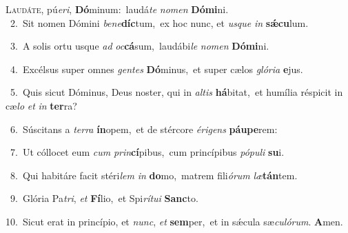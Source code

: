 \lettrine{\initial\textcolor{\initialcolor}{L}}{audáte,} pú\-\textit{e}\-\textit{ri}, \textbf{Dó}\-minum:~\star laudá\textit{te} \textit{no}\-\textit{men} \textbf{Dó}\-\textbf{mi}ni.\\
{\numbfont\textcolor{\numbcolor}{~2.}}~Sit nomen Dómini \textit{be}\-\textit{ne}\textbf{díc}tum,~\star ex hoc nunc, et \textit{us}\-\textit{que} \textit{in} \textbf{sǽ}\-\textbf{cu}lum.\par
{\numbfont\textcolor{\numbcolor}{~3.}}~A solis ortu usque \textit{ad} \textit{oc}\-\textbf{cá}sum,~\star laudábi\textit{le} \textit{no}\-\textit{men} \textbf{Dó}\-\textbf{mi}ni.\par
{\numbfont\textcolor{\numbcolor}{~4.}}~Excélsus super omnes \textit{gen}\-\textit{tes} \textbf{Dó}\-minus,~\star et super cælos \textit{gló}\-\textit{ri}\textit{a} \textbf{e}\-jus.\par
{\numbfont\textcolor{\numbcolor}{~5.}}~Quis sicut Dóminus, Deus noster, qui in \textit{al}\-\textit{tis} \textbf{há}\-bitat,~\star et humília réspicit in cæ\textit{lo} \textit{et} \textit{in} \textbf{ter}\-ra?\par
{\numbfont\textcolor{\numbcolor}{~6.}}~Súscitans a \textit{ter}\-\textit{ra} \textbf{ín}\-opem,~\star et de stércore \textit{é}\-\textit{ri}\textit{gens} \textbf{páu}\-\textbf{pe}rem:\par
{\numbfont\textcolor{\numbcolor}{~7.}}~Ut cóllocet eum \textit{cum} \textit{prin}\-\textbf{cí}pibus,~\star cum princípibus \textit{pó}\-\textit{pu}\textit{li} \textbf{su}\-i.\par
{\numbfont\textcolor{\numbcolor}{~8.}}~Qui habitáre facit stéri\textit{lem} \textit{in} \textbf{do}\-mo,~\star matrem fili\-\textit{ó}\-\textit{rum} \textit{læ}\-\textbf{tán}tem.\par
{\numbfont\textcolor{\numbcolor}{~9.}}~Glória Pa\-\textit{tri}\-, \textit{et} \textbf{Fí}\-lio,~\star et Spi\-\textit{rí}\-\textit{tu}\textit{i} \textbf{Sanc}\-to.\par
{\numbfont\textcolor{\numbcolor}{10.}}~Sicut erat in princípio, et \textit{nunc}\-, \textit{et} \textbf{sem}\-per,~\star et in sǽcula sæ\-\textit{cu}\-\textit{ló}\textit{rum}. \textbf{A}\-men.\par
